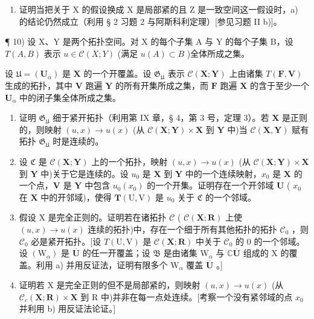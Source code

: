 \begin{enumerate}
\def\labelenumi{\alph{enumi})}
\setcounter{enumi}{1}
\tightlist
\item
  证明当把关于 X 的假设换成 X 是局部紧的且 Z 是一致空间这一假设时，a) 的结论仍然成立（利用 § 2 习题 2 与阿斯科利定理）{[}参见习题 II b){]}。
\end{enumerate}

¶ 10) 设 X、Y 是两个拓扑空间。对 X 的每个子集 A 与 Y 的每个子集 B，设 \(T(A, B)\) 表示 \(u \in \mathcal{C}(X; Y)\) (满足 \(u(A) \subset B\) )全体所成之集。

设 \(\mathfrak{U} = (\mathbf{U}_{\alpha})\) 是 \(\mathbf{X}\) 的一个开覆盖。设 \(\mathfrak{G}_{\mathfrak{U}}\) 表示 \(\mathcal{C}(\mathbf{X};\mathbf{Y})\) 上由诸集 \(T(\mathbf{F},\mathbf{V})\) 生成的拓扑，其中 \(\mathbf{V}\) 跑遍 \(\mathbf{Y}\) 的所有开集所成之集，而 \(\mathbf{F}\) 跑遍 \(\mathbf{X}\) 的含于至少一个 \(\mathbf{U}_{\alpha}\) 中的闭子集全体所成之集。

\begin{enumerate}
\def\labelenumi{\alph{enumi})}
\item
  证明 \(\mathfrak{G}_{\mathfrak{U}}\) 细于紧开拓扑（利用第 IX 章，§ 4，第 3 号，定理 3）。若 \(\mathbf{X}\) 是正则的，则映射 \((u, x) \to u(x)\) (从 \(\mathcal{C}(\mathbf{X}; \mathbf{Y}) \times \mathbf{X}\) 到 \(\mathbf{Y}\) 中)当 \(\mathcal{C}(\mathbf{X}, \mathbf{Y})\) 赋有拓扑 \(\mathfrak{G}_{\mathfrak{U}}\) 时是连续的。
\item
  设 \(\mathfrak{C}\) 是 \(\mathcal{C}(\mathbf{X};\mathbf{Y})\) 上的一个拓扑，映射 \((u,x)\to u(x)\) (从 \(\mathcal{C}(\mathbf{X};\mathbf{Y})\times \mathbf{X}\) 到 \(\mathbf{Y}\) 中)关于它是连续的。设 \(u_0\) 是 \(\mathbf{X}\) 到 \(\mathbf{Y}\) 中的一个连续映射，\(x_0\) 是 \(\mathbf{X}\) 的一个点，\(\mathbf{V}\) 是 \(\mathbf{Y}\) 中包含 \(u_0(x_0)\) 的一个开集。证明存在一个开邻域 \(\mathbf{U}\) ( \(x_0\) 在 \(\mathbf{X}\) 中的开邻域)，使得 \(\pmb{T}(\mathrm{U},\mathrm{V})\) 是 \(u_0\) 关于 \(\mathfrak{C}\) 的一个邻域。
\item
  假设 X 是完全正则的。证明若在诸拓扑 \(\mathcal{C}\) ( \(\mathcal{C}(\mathbf{X};\mathbf{R})\) 上使 \((u,x)\to u(x)\) 连续的拓扑)中，存在一个细于所有其他拓扑的拓扑 \(\mathcal{C}_0\) ，则 \(\mathcal{C}_0\) 必是紧开拓扑。{[}设 \(T(\mathrm{U},\mathrm{V})\) 是 \(\mathcal{C}(\mathbf{X};\mathbf{R})\) 中关于 \(\mathcal{C}_0\) 的 0 的一个邻域。设 \((\mathrm{W}_{\alpha})\) 是 \(\overline{\mathbf{U}}\) 的任一开覆盖；设 \(\mathfrak{B}\) 是由诸集 \(\mathrm{W}_{\alpha}\) 与 \(\mathbb{C}\overline{\mathbf{U}}\) 组成的 X 的覆盖。利用 a) 并用反证法，证明有限多个 \(\mathrm{W}_{\alpha}\) 覆盖 \(\overline{\mathbf{U}}\) 。{]}
\item
  证明若 X 是完全正则的但不是局部紧的，则映射 \((u, x) \to u(x)\) (从 \(\mathcal{C}_{c}(\mathbf{X}; \mathbf{R}) \times \mathbf{X}\) 到 R 中)并非在每一点处连续。{[}考察一个没有紧邻域的点 \(x_{0}\) 并利用 b) 用反证法论证。{]}
\end{enumerate}

